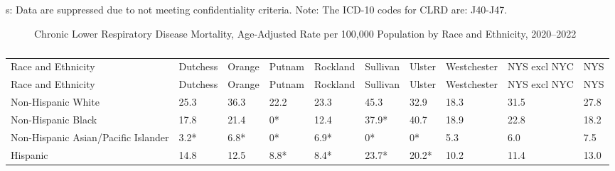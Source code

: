 \documentclass[
  english,
  letterpaper,
]{report}
\begin{document}
\begin{tcolorbox}[enhanced jigsaw, breakable, leftrule=.75mm, title=\textcolor{quarto-callout-note-color}{\faInfo}\hspace{0.5em}{Note}, bottomrule=.15mm, opacityback=0, left=2mm, colback=white, bottomtitle=1mm, coltitle=black, colbacktitle=quarto-callout-note-color!10!white, colframe=quarto-callout-note-color-frame, opacitybacktitle=0.6, toptitle=1mm, titlerule=0mm, arc=.35mm, rightrule=.15mm, toprule=.15mm]

s: Data are suppressed due to not meeting confidentiality criteria.
Note: The ICD-10 codes for CLRD are: J40-J47.

\end{tcolorbox}

\begin{figure}


\caption{\label{fig-clrd-mortal-rande-aar}Chronic Lower Respiratory
Disease Mortality, Age-Adjusted Rate per 100,000 Population by Race and
Ethnicity, 2020--2022}

\end{figure}%

\begin{longtable}[]{@{}llllllllll@{}}

\caption{\label{tbl-clrd-mortal-rande-aar}Chronic Lower Respiratory
Disease Mortality, Age-Adjusted Rate per 100,000 Population by Race and
Ethnicity, 2020--2022}

\tabularnewline

\caption{}\label{T_707fa}\tabularnewline
\toprule\noalign{}
Race and Ethnicity & Dutchess & Orange & Putnam & Rockland & Sullivan &
Ulster & Westchester & NYS excl NYC & NYS \\
\midrule\noalign{}
\endfirsthead
\toprule\noalign{}
Race and Ethnicity & Dutchess & Orange & Putnam & Rockland & Sullivan &
Ulster & Westchester & NYS excl NYC & NYS \\
\midrule\noalign{}
\endhead
\bottomrule\noalign{}
\endlastfoot
Non-Hispanic White & 25.3 & 36.3 & 22.2 & 23.3 & 45.3 & 32.9 & 18.3 &
31.5 & 27.8 \\
Non-Hispanic Black & 17.8 & 21.4 & 0* & 12.4 & 37.9* & 40.7 & 18.9 &
22.8 & 18.2 \\
Non-Hispanic Asian/Pacific Islander & 3.2* & 6.8* & 0* & 6.9* & 0* & 0*
& 5.3 & 6.0 & 7.5 \\
Hispanic & 14.8 & 12.5 & 8.8* & 8.4* & 23.7* & 20.2* & 10.2 & 11.4 &
13.0 \\

\end{longtable}
\end{document}
